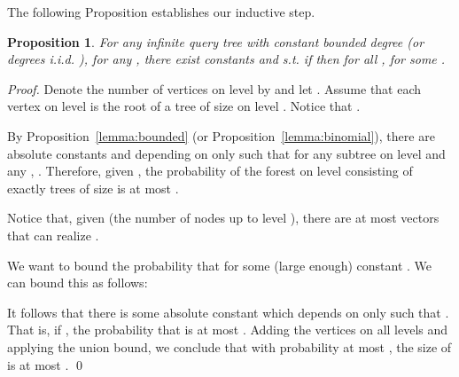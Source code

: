 \documentclass[english, oribibl]{llncs}
\newtheorem{theorem}{Theorem}[section]
\newtheorem{proposition}[theorem]{Proposition}
\begin{document}
The following Proposition establishes our inductive step.
\begin{proposition}
\label{infinite}
For any infinite query tree  with constant bounded degree  (or degrees i.i.d. ), for any ,
there exist constants  and 
s.t. if  
then   for all ,
for some .
\end{proposition}


\begin{proof}
Denote the number of vertices on level  by  and let .
Assume that each vertex  on level  is the root of a tree of size  on level .
Notice that .

By Proposition~\ref{lemma:bounded} (or Proposition~\ref{lemma:binomial}),
there are absolute constants  and  depending on  only such that
for any subtree  on level  and any ,
.
Therefore, given  ,
the probability of the forest on level  consisting of exactly trees of size
 is at most .

Notice that, given  (the number of nodes up to level ), there are at most   vectors  that can realize . 

We want to bound the probability that  for some (large enough) constant .
We can bound this as follows:





It follows that there is some absolute constant  which depends on  only such that
.
That is, if ,
the probability that  is at most .
Adding the vertices on all  levels and applying the union bound, we
conclude that with probability at most , the size of  is at most . \qed
\end{proof}


\begin{comment}
\subsection{Tightness of the bound}
Our bound of  on the size of the tree is tight.
\begin{theorem}
For any graph  with bounded degree ,  ,
there is a constant  which depends only on  such that for all large enough ,
\begin{center}

\end{center}
\end{theorem}
\begin{proof}
Consider a path of length  from .
The probability that the rank of every vertex  on the path is less than the rank of
 is . \qed

\end{proof}

\end{comment} 
\end{document}
